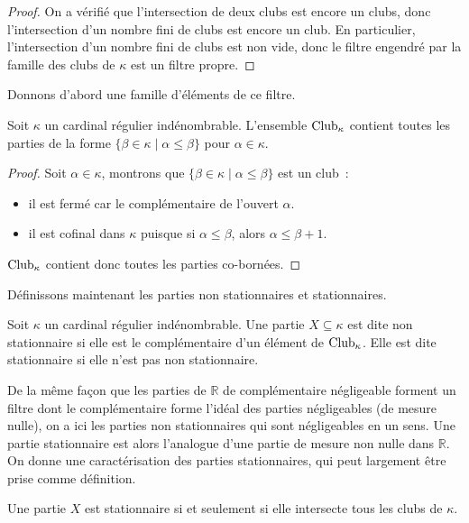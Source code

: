 \begin{proof}
  On a vérifié que l'intersection de deux clubs est encore un clubs, donc
  l'intersection d'un nombre fini de clubs est encore un club. En particulier,
  l'intersection d'un nombre fini de clubs est non vide, donc le filtre engendré
  par la famille des clubs de $\kappa$ est un filtre propre.
\end{proof}

Donnons d'abord une famille d'éléments de ce filtre.

\begin{property}
  Soit $\kappa$ un cardinal régulier indénombrable. L'ensemble $\operatorname{Club}_\kappa$
  contient toutes les parties de la forme
  $\{\beta \in\kappa\mid \alpha\leq\beta\}$ pour $\alpha \in \kappa$.
\end{property}

\begin{proof}
  Soit $\alpha \in \kappa$, montrons que $\{\beta\in\kappa\mid\alpha\leq\beta\}$
  est un club~:
  \begin{itemize}
  \item il est fermé car le complémentaire de l'ouvert $\alpha$.
  \item il est cofinal dans $\kappa$ puisque si $\alpha \leq \beta$, alors
    $\alpha \leq \beta + 1$.
  \end{itemize}
  $\operatorname{Club}_\kappa$ contient donc toutes les parties co-bornées.
\end{proof}

Définissons maintenant les parties non stationnaires et stationnaires.

\begin{definition}
  Soit $\kappa$ un cardinal régulier indénombrable. Une partie
  $X\subseteq\kappa$ est dite non stationnaire si elle est le complémentaire
  d'un élément de $\operatorname{Club}_\kappa$. Elle est dite stationnaire si elle n'est pas
  non stationnaire.
\end{definition}

De la même façon que les parties de $\mathbb R$ de complémentaire négligeable
forment un filtre dont le complémentaire forme l'idéal des parties négligeables
(de mesure nulle), on a ici les parties non stationnaires qui sont négligeables
en un sens. Une partie stationnaire est alors l'analogue d'une partie de mesure
non nulle dans $\mathbb R$. On donne une caractérisation des parties
stationnaires, qui peut largement être prise comme définition.

\begin{proposition}
  Une partie $X$ est stationnaire si et seulement si elle intersecte tous les
  clubs de $\kappa$.
\end{proposition}

